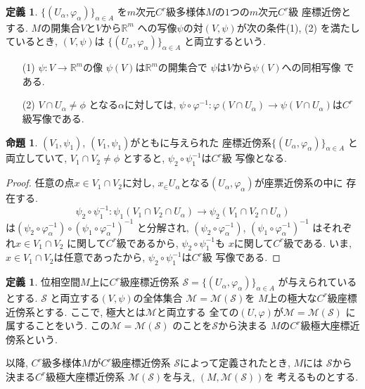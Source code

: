 \documentclass[a4j,12pt]{jarticle}
\theoremstyle{definition}
\newtheorem{definition}[theorem]{定義}
\newtheorem{proposition}[theorem]{命題}
\begin{document}
\begin{definition}
    $\{(U_\alpha ,\varphi _\alpha)\}_{\alpha \in A}$
    を$m$次元$C^r$級多様体$M$の$1$つの$m$次元$C^r$級
    座標近傍とする. $M$の開集合$V$と$V$から$\mathbb{R}^m$
    への写像$\psi$の対$(V,\psi)$が次の条件(1), (2)
    を満たしているとき, $(V,\psi)$は
    $\{(U_\alpha ,\varphi _\alpha)\}_{\alpha \in A}$
    と両立するという. 
    \begin{itemize}
        \item[(1)]$\psi:V\to \mathbb{R}^m$の像
        $\psi (V)$は$\mathbb{R}^m$の開集合で
        $\psi$は$V$から$\psi (V)$への同相写像
        である. 
        \item[(2)] $V\cap U_\alpha \neq \phi$
        となる$\alpha$に対しては, 
        $\psi \circ \varphi ^{-1}:
        \varphi(V\cap U_\alpha)\to
        \psi(V\cap U_\alpha)$は$C^r$級写像である. 
    \end{itemize}
\begin{proposition}
    $(V_1,\psi_1)$, $(V_1,\psi_1)$がともに与えられた
    座標近傍系$\{(U_\alpha ,
    \varphi _\alpha)\}_{\alpha \in A}$
    と両立していて, $V_1\cap V_2\neq \phi$
    とすると, $\psi_2\circ \psi_1^{-1}$は$C^r$級
    写像となる. 
\end{proposition}
\begin{proof}
    任意の点$x\in V_1\cap V_2$に対し, 
    $x_\in U_\alpha$となる$(U_\alpha, 
    \varphi_\alpha)$が座票近傍系の中に
    存在する. 
    $$\psi_2\circ \psi_1^{-1}:
    \psi_1(V_1\cap V_2\cap U_\alpha)\to
    \psi_2(V_1\cap V_2\cap U_\alpha)$$
    は$(\psi_2\circ \varphi_\alpha^{-1})\circ
    (\psi_1\circ \varphi_\alpha^{-1})^{-1}$
    と分解され, 
    $(\psi_2\circ \varphi_\alpha^{-1})$, 
    $(\psi_1\circ \varphi_\alpha^{-1})^{-1}$
    はそれぞれ$x\in V_1\cap V_2$
    に関して$C^r$級であるから, 
    $\psi_2\circ \psi_1^{-1}$も
    $x$に関して$C^r$級である. いま, 
    $x\in V_1\cap V_2$は任意であったから, 
    $\psi_2\circ \psi_1^{-1}$は$C^r$級
    写像である. 
\end{proof}
\begin{definition}
    位相空間$M$上に$C^r$級座標近傍系
    $\mathcal{S}=
    \{(U_\alpha, \varphi_\alpha)\}_{\alpha\in A}$
    が与えられているとする. 
    $\mathcal{S}$
    と両立する$(V,\psi)$の全体集合
    $\mathcal{M}=\mathcal{M}(\mathcal{S})$を
    $M$上の極大な$C^r$級座標近傍系とする. 
    ここで, 極大とは$\mathcal{M}$と両立する
    全ての$(U,\varphi)$が$\mathcal{M}
    =\mathcal{M}(\mathcal{S})$
    に属することをいう. この$\mathcal{M}
    =\mathcal{M}(\mathcal{S})$
    のことを$\mathcal{S}$から決まる
    $M$の$C^r$級極大座標近傍系という. 
\end{definition}
以降, $C^r$級多様体$M$が$C^r$級座標近傍系
$\mathcal{S}$によって定義されたとき, $M$には
$\mathcal{S}$から決まる$C^r$級極大座標近傍系
$\mathcal{M}(\mathcal{S})$を与え, 
$(M,\mathcal{M}(\mathcal{S}))$を
考えるものとする. 
\end{definition}
\end{document}
